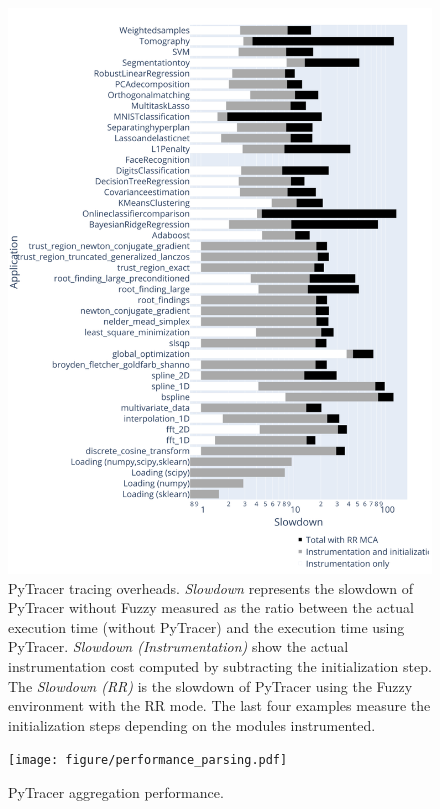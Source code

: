 \documentclass[10pt,journal,compsoc]{IEEEtran}
\newcommand{\pytracer}[0]{PyTracer\xspace}
\begin{document}
\begin{figure}
    \centering
    \includegraphics[width=\linewidth]{figure/performance.pdf}
    \caption{ \pytracer tracing overheads. \textit{Slowdown} represents the
        slowdown of \pytracer without Fuzzy measured as the ratio between the
        actual execution time (without \pytracer) and the execution time using
        \pytracer. \textit{Slowdown (Instrumentation)} show the actual
        instrumentation cost computed by subtracting the initialization step.
        The \textit{Slowdown (RR)} is the slowdown of \pytracer using the Fuzzy
        environment with the RR mode. The last four examples measure the
        initialization steps depending on the modules instrumented.
    }
    \label{fig:performance_tracing}
\end{figure}

\begin{figure}
    \centering
    \texttt{[image: figure/performance\_parsing.pdf]}
    
    \caption{\pytracer aggregation performance.
    }
    \label{fig:performance_parsing}
\end{figure}
\end{document}
